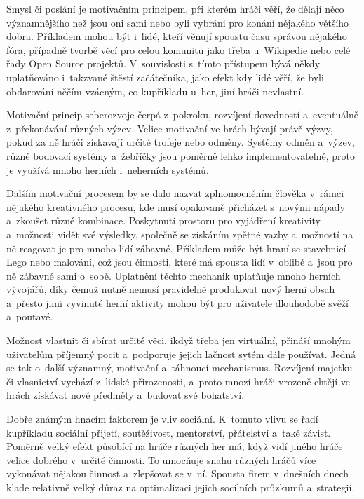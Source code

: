 \documentclass[12pt]{article}
\begin{document}
Smysl či poslání je motivačním principem, při kterém hráči 
věří, že dělají něco významnějšího než jsou oni sami nebo
byli vybráni pro konání nějakého většího dobra.
Příkladem mohou být i~lidé, kteří věnují spoustu času správou nějakého
fóra, případně tvorbě věcí pro celou komunitu jako třeba u~Wikipedie nebo 
celé řady Open Source projektů.
V~souvislosti s~tímto přístupem bývá někdy uplatňováno
i~takzvané štěstí začátečníka, jako efekt kdy lidé věří, 
že byli obdarování něčím vzácným, co kupříkladu u~her, jiní hráči nevlastní.

Motivační princip seberozvoje čerpá z~pokroku, rozvíjení dovedností
a~eventuálně z~překonávání různých výzev.
Velice motivační ve hrách bývají právě výzvy,
pokud za ně hráči získavají určité trofeje nebo odměny. 
Systémy odměn a~výzev, různé bodovací systémy a~žebříčky
jsou poměrně lehko implementovatelné,
proto je využívá mnoho herních i~neherních systémů.

Dalším motivační procesem by se dalo nazvat zplnomocněním člověka 
v~rámci nějakého kreativného procesu, kde musí opakovaně přicházet s~novými
nápady a~zkoušet různé kombinace. Poskytnutí prostoru pro vyjádření
kreativity a~možnosti vidět své výsledky, společně se získáním zpětné vazby
a~možností na ně reagovat je pro mnoho lidí zábavné.
Příkladem může být hraní se stavebnicí Lego nebo malování,
což jsou činnosti, které má spousta lidí v~oblibě a~jsou pro ně zábavné sami o~sobě.
Uplatnění těchto mechanik uplatňuje mnoho herních vývojářů,
díky čemuž nutně nemusí pravidelně produkovat nový herní obsah 
a~přesto jimi vyvinuté herní aktivity mohou být pro uživatele dlouhodobě svěží a~poutavé.

Možnost vlastnit či sbírat určité věci, ikdyž třeba jen virtuální,
přináší mnohým uživatelům příjemný pocit a~podporuje jejich lačnost
sytém dále používat. Jedná se tak o~další významný, motivační a~táhnoucí mechanismus.
Rozvíjení majetku či vlasnictví vychází z~lidské přirozenosti,
a~proto mnozí hráči vrozeně chtějí ve hrách získávat nové předměty
a~budovat své bohatství.

Dobře známým hnacím faktorem je vliv sociální. 
K~tomuto vlivu se řadí kupříkladu sociální přijetí, soutěživost, mentorství,
přátelství a~také závist. Poměrně velký efekt působící na hráče různých her
má, když vidí jiného hráče velice dobrého v~určité činnosti. 
To umocňuje snahu různých hráčů více vykonávat nějakou činnost a~zlepšovat se v~ní.
Spousta firem v~dnešních dnech klade relativně velký důraz na optimalizaci
jejich socílních průzkumů a~strategií.
\end{document}
